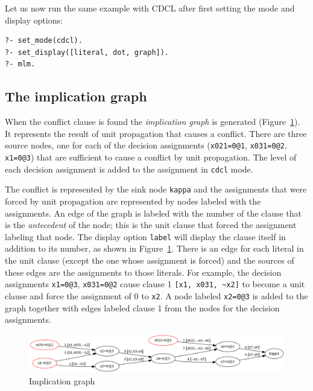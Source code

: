 \documentclass[11pt]{report}
\newcommand*{\p}[1]{\textup{\texttt{#1}}}
\begin{document}
Let us now run the same example with CDCL after first setting the mode
and display options:

\begin{verbatim}
?- set_mode(cdcl).
?- set_display([literal, dot, graph]).
?- mlm.
\end{verbatim}

\subsection{The implication graph}

When the conflict clause is found the \emph{implication graph} is
generated (Figure~\ref{fig.graph}). It represents the result of unit
propagation that causes a conflict. There are three source nodes, one
for each of the decision assignments (\p{x021=0@1}, \p{x031=0@2},
\p{x1=0@3}) that are sufficient to cause a conflict by unit propagation.
The level of each decision assignment is added to the assignment in
\p{cdcl} mode.

The conflict is represented by the sink node \p{kappa} and the
assignments that were forced by unit propagation are represented by
nodes labeled with the assignments. An edge of the graph is labeled with
the number of the clause that is the \emph{antecedent} of the node; this
is the unit clause that forced the assignment labeling that node. The
display option \p{label} will display the clause itself in addition to
its number, as shown in Figure~\ref{fig.graph}. There is an edge for
each literal in the unit clause (except the one whose assignment is
forced) and the sources of these edges are the assignments to those
literals. For example, the decision assignments \p{x1=0@3}, \p{x031=0@2}
cause clause 1 \verb+[x1, x031, ~x2]+ to become a unit clause and force
the assignment of 0 to \p{x2}. A node labeled \p{x2=0@3} is added to the
graph together with edges labeled clause 1 from the nodes for the
decision assignments.

\begin{figure}
\begin{center}
\includegraphics[keepaspectratio=true,width=\textwidth]{graph}
\end{center}
\caption{Implication graph}\label{fig.graph}
\end{figure}
\end{document}
